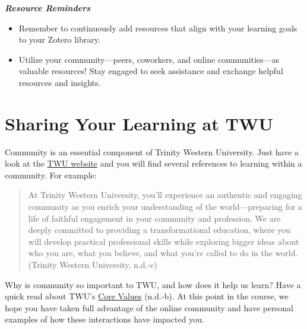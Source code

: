 \documentclass[
  letterpaper,
  DIV=11,
  numbers=noendperiod]{scrreprt}
\providecommand{\tightlist}{%
  \setlength{\itemsep}{0pt}\setlength{\parskip}{0pt}}\usepackage{longtable,booktabs,array}
\begin{document}
\begin{tcolorbox}[enhanced jigsaw, toprule=.15mm, colback=white, colframe=quarto-callout-note-color-frame, arc=.35mm, opacityback=0, breakable, rightrule=.15mm, bottomrule=.15mm, leftrule=.75mm, left=2mm]
\begin{minipage}[t]{5.5mm}
\textcolor{quarto-callout-note-color}{\faInfo}
\end{minipage}%
\begin{minipage}[t]{\textwidth - 5.5mm}

\textbf{\emph{Resource Reminders}}

\begin{itemize}
\tightlist
\item
  Remember to continuously add resources that align with your learning
  goals to your Zotero library.
\item
  Utilize your community---peers, coworkers, and online communities---as
  valuable resources! Stay engaged to seek assistance and exchange
  helpful resources and insights.
\end{itemize}

\end{minipage}%
\end{tcolorbox}

\section{Sharing Your Learning at
TWU}\label{sharing-your-learning-at-twu}

Community is an essential component of Trinity Western University. Just
have a look at the \href{https://www.twu.ca/}{TWU website} and you will
find several references to learning within a community. For example:

\begin{quote}
At Trinity Western University, you'll experience an authentic and
engaging community as you enrich your understanding of the
world---preparing for a life of faithful engagement in your community
and profession. We are deeply committed to providing a transformational
education, where you will develop practical professional skills while
exploring bigger ideas about who you are, what you believe, and what
you're called to do in the world. (Trinity Western University, n.d.-c)
\end{quote}

Why is community so important to TWU, and how does it help us learn?
Have a quick read about TWU's
\href{https://www.twu.ca/about-us/commitments/core-values}{Core Values}
(n.d.-b). At this point in the course, we hope you have taken full
advantage of the online community and have personal examples of how
these interactions have impacted you.
\end{document}
